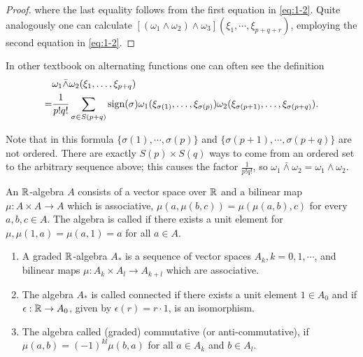\begin{proof}
  where the last equality follows from the first equation in \ref{eq:1-2}. Quite analogously one can calculate
  $[(\omega_1\wedge\omega_2)\wedge\omega_3](\xi_1, \cdots, \xi_{p+q+r})$, employing the second equation in \ref{eq:1-2}.
\end{proof}

\begin{remark}
In other textbook on alternating functions one can often see the definition
\begin{align*}
    & \omega_{1}\bar{\wedge}\omega_{2}(\xi_{1},\ldots,\xi_{p+q})\\
  = & \frac{1}{p!q!}\sum_{\sigma\in S(p+q)}\operatorname{sign}(\sigma)
      \omega_{1}(\xi_{\sigma(1)},\ldots,\xi_{\sigma(p)})
      \omega_{2}(\xi_{\sigma(p+1)},\ldots,\xi_{\sigma(p+q)}).
\end{align*}

Note that in this formula $\{\sigma(1), \cdots,\sigma(p)\}$ and $\{\sigma(p + 1), \cdots, \sigma(p + q)\}$ are not
ordered. There are exactly $S(p)\times S(q)$ ways to come from an ordered set to the arbitrary sequence above; 
this causes the factor $\frac{1}{p!q!}$, so $\omega_1\bar{\wedge}\omega_2 = \omega_1\wedge\omega_2$.
\end{remark}

An $\mathbb{R}$-algebra $A$ consists of a vector space over $\mathbb{R}$ and a bilinear map $\mu:A\times A\to A$
which is associative, $\mu(a, \mu(b,c)) = \mu(\mu(a, b), c)$ for every $a,b,c \in A$. The
algebra is called  if there exists a unit element for $\mu, \mu(1, a) = \mu( a, 1) = a$
for all $a\in A$.

\begin{definition}\;\par
  \begin{enumerate}[label=(\roman*)]
    \item A graded $\mathbb{R}$-algebra $A_*$ is a sequence of vector spaces $A_k, k = 0,1, \cdots$,
      and bilinear maps $\mu:A_k\times A_l\to A_{k+l}$ which are associative.
    \item The algebra $A_*$ is called connected if there exists a unit element $1\in A_0$ and 
      if $\epsilon:\mathbb{R}\to A_0$, given by $\epsilon(r) = r\cdot 1$, is an isomorphism.
    \item The algebra called (graded) commutative (or anti-commutative), if $\mu(a, b) = (-1)^{kl}\mu(b, a)$
      for all $a\in A_k$ and $b\in A_l$.
  \end{enumerate}
\end{definition}


